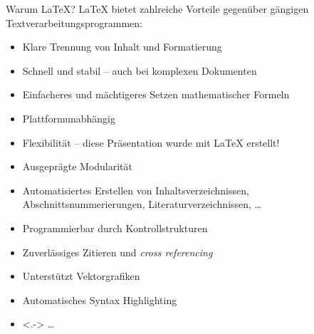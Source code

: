 \documentclass[10pt,wide,xcolor={x11names},hyperref={colorlinks=false},pantone312,mygreen,handout]{beamer}
\begin{document}
\begin{frame}[t]{Warum LaTeX?}
	LaTeX bietet zahlreiche Vorteile gegenüber gängigen Textverarbeitungsprogrammen: \cite{CTAN}
	\begin{itemize}[<+->]
		\item Klare Trennung von Inhalt und Formatierung
		\item Schnell und stabil -- auch bei komplexen Dokumenten
		\item Einfacheres und mächtigeres Setzen mathematischer Formeln
		\item Plattformunabhängig
		\item Flexibilität -- diese Präsentation wurde mit LaTeX erstellt!
		\item Ausgeprägte Modularität
		\item Automatisiertes Erstellen von Inhaltsverzeichnissen, Abschnittsnummerierungen, Literaturverzeichnissen, \dots
		\item Programmierbar durch Kontrollstrukturen
		\item Zuverlässiges Zitieren und \textit{cross referencing}
		\item Unterstützt Vektorgrafiken
		\item Automatisches Syntax Highlighting
		\item<.-> \dots
	\end{itemize}
\end{frame}
\end{document}
